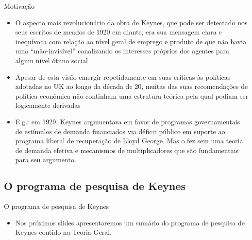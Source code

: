 \documentclass[10pt]{beamer}
\begin{document}
\begin{frame}{Motivação}
    \begin{itemize}
        \item O aspecto mais revolucionário da obra de Keynes, que pode ser detectado nos seus escritos de meados de 1920 em diante, era sua mensagem clara e inequívoca com relação ao nível geral de emprego e produto de que não havia uma ``mão-invisível'' canalizando os interesses próprios dos agentes para algum nível ótimo social
        \bigskip
        \item Apesar de esta visão emergir repetidamente em suas críticas às políticas adotadas no UK ao longo da década de 20, muitas das suas recomendações de política econômica não continham uma estrutura teórica pela qual podiam ser logicamente derivadas
        \bigskip
        \item E.g.: em 1929, Keynes argumentava em favor de programas governamentais de estímulos de demanda financiados via déficit público em suporte ao programa liberal de recuperação de Lloyd George. Mas o fez sem uma teoria de demanda efetiva e mecanismos de multiplicadores que são fundamentais para seu argumento.
    \end{itemize}
\end{frame}

\subsection{O programa de pesquisa de Keynes}
\begin{frame}{O programa de pesquisa de Keynes}
    \begin{itemize}
        \item Nos próximos slides apresentaremos um sumário do programa de pesquisa de Keynes contido na Teoria Geral.
    \end{itemize}
\end{frame}
\end{document}
